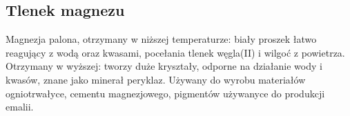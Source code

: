 \subsection{Tlenek magnezu }
Magnezja palona, otrzymany w niższej temperaturze: biały proszek łatwo reagujący z wodą oraz kwasami, pocełania tlenek węgla(II) i wilgoć z powietrza.
Otrzymany w wyższej: tworzy duże kryształy, odporne na działanie wody i kwasów, znane jako minerał peryklaz.
Używany do wyrobu materiałów ogniotrwałyce, cementu magnezjowego, pigmentów używanyce do produkcji emalii.


